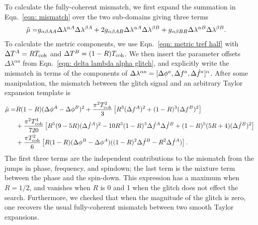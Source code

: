 \documentclass[../full_thesis/full_thesis.tex]{subfiles}
\begin{document}
To calculate the fully-coherent mismatch, we first expand
the summation in Eqn.~\eqref{eqn: mismatch} over the two sub-domains giving three terms
\begin{align}
\begin{split}
\tilde{\mu} = &
g_{\alpha\beta AA}\Delta\lambda^{\alpha A} \Delta\lambda^{\beta A} +
2 g_{\alpha\beta AB}\Delta\lambda^{\alpha A} \Delta\lambda^{\beta B}
+ g_{\alpha\beta BB}\Delta\lambda^{\alpha B} \Delta\lambda^{\beta B}.
\end{split}
\end{align}
To calculate the metric components, we use Eqn.~\eqref{eqn: metric tref half}
with $\Delta T^A = RT_{\mathrm{coh}}$ and $\Delta T^B = (1-R)T_{\mathrm{coh}}$.
We then insert the parameter offsets $\Delta\lambda^{\alpha a}$
from Eqn.~\eqref{eqn: delta lambda alpha glitch},
and explicitly write the mismatch in terms of the components  of $\Delta\lambda^{\alpha a}=
[\Delta\phi^{a}, \Delta f^{a}, \Delta\dot{f}^{a}]^{\alpha}$.
After some manipulation, the mismatch between the glitch signal and an arbitrary
Taylor expansion template is
\begin{align}
\begin{split}
\tilde{\mu} = & R(1-R)(\Delta\phi^A - \Delta\phi^B)^{2}
+ \frac{\pi^{2}T_{\mathrm{coh}}^{2}}{3}
\left[R^{3}(\Delta f^A)^{2} + (1-R)^{3}  (\Delta f^B)^{2}\right] \\
& + \frac{\pi^{2} T_{\mathrm{coh}}^{4}}{720}\left[
       R^{5}(9-5R)(\Delta\dot{f}^A)^{2}
       -10R^{3}(1-R)^{3}\Delta\dot{f}^A\Delta\dot{f}^B
       + (1-R)^{5}(5R+4)(\Delta\dot{f}^B)^{2}
                                       \right] \\
& + \frac{\pi T_{\mathrm{coh}}^{2}}{6}\left[R(1-R)
    (\Delta\phi^B - \Delta\phi^A)
    ((1-R)^{2}\Delta\dot{f}^B -  R^{2}\Delta\dot{f}^A)
                                 \right].
\end{split}
\label{eqn: mutilde fully-coherent unminimised}
\end{align}
The first three terms are the independent contributions to the
mismatch from the jumps in phase, frequency, and spindown; the last term is the mixture
term between the phase and the spin-down.  This expression has a maximum
when $R = 1/2$, and vanishes when $R$ is 0 and 1 when the glitch does not effect the
search. Furthermore, we checked that when the magnitude of the glitch is zero,
one recovers the usual fully-coherent mismatch between two smooth Taylor expansions.
\end{document}
